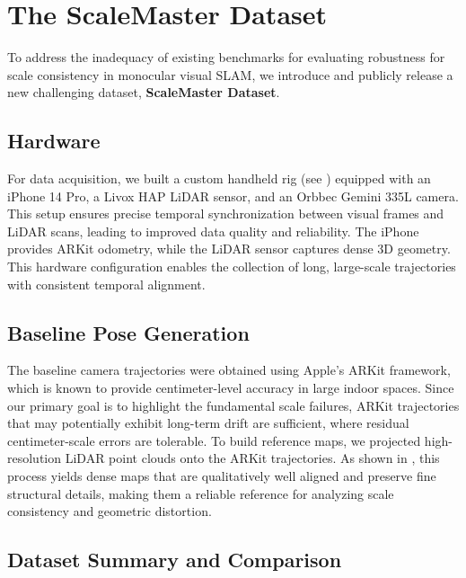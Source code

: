 % 
\section{The ScaleMaster Dataset}
\label{sec:dataset}

To address the inadequacy of existing benchmarks for evaluating robustness for scale consistency in monocular visual \ac{SLAM}, we introduce and publicly release a new challenging dataset, \textbf{ScaleMaster Dataset}.

% 
\subsection{Hardware}
\label{sec:dataset_hw}

For data acquisition, we built a custom handheld rig (see ) equipped with an iPhone 14 Pro, a Livox HAP LiDAR sensor, and an Orbbec Gemini 335L camera. This setup ensures precise temporal synchronization between visual frames and LiDAR scans, leading to improved data quality and reliability. The iPhone provides ARKit odometry, while the LiDAR sensor captures dense 3D geometry. This hardware configuration enables the collection of long, large-scale trajectories with consistent temporal alignment.

% 
\subsection{Baseline Pose Generation}
\label{sec:dataset_baseline}

The baseline camera trajectories were obtained using Apple’s ARKit framework, which is known to provide centimeter-level accuracy in large indoor spaces. Since our primary goal is to highlight the fundamental scale failures, ARKit trajectories that may potentially exhibit long-term drift are sufficient, where residual centimeter-scale errors are tolerable. To build reference maps, we projected high-resolution LiDAR point clouds onto the ARKit trajectories. As shown in , this process yields dense maps that are qualitatively well aligned and preserve fine structural details, making them a reliable reference for analyzing scale consistency and geometric distortion.

% 
\subsection{Dataset Summary and Comparison}
\label{sec:dataset_summary}

